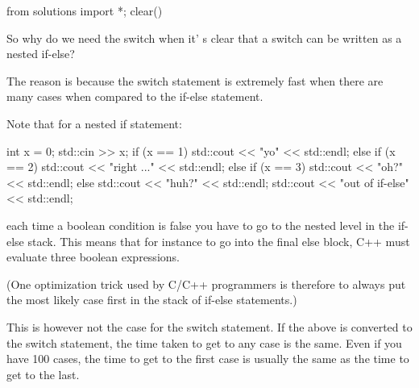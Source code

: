 \begin{python0}
from solutions import *; clear()
\end{python0}

So why do we need the switch when it' s clear that a
switch can be written as a nested if-else?

The reason is because the switch statement is extremely fast when there
are many cases when compared to the if-else statement.

Note that for a nested if statement:
\begin{console}
int x = 0;
std::cin >> x;
if (x == 1)
{
     std::cout << "yo" << std::endl;
}
else if (x == 2)
{
     std::cout << "right ..." << std::endl;
}
else if (x == 3)
{
     std::cout << "oh?" << std::endl;
}
else
{
     std::cout << "huh?" << std::endl;
}
std::cout << "out of if-else" << std::endl;
\end{console}

each time a boolean condition is false you have to go to the nested
level in the if-else stack. This means that for instance to go into the
final else block, C++ must evaluate three boolean expressions.

(One optimization trick used by C/C++ programmers is therefore to always
put the most likely case first in the stack of if-else statements.)

This is however not the case for the switch statement. If the above is
converted to the switch statement, the time taken to get to any case is
the same. Even if you have 100 cases, the time to get to the first case
is usually the same as the time to get to the last.

